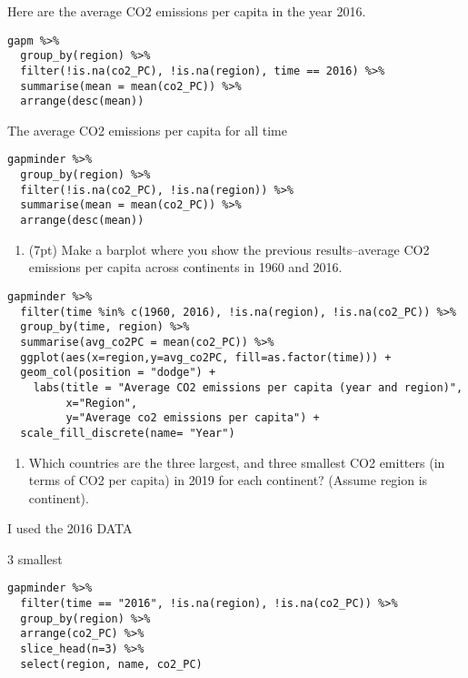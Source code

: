 \documentclass[]{article}
\providecommand{\tightlist}{%
  \setlength{\itemsep}{0pt}\setlength{\parskip}{0pt}}
\begin{document}
Here are the average CO2 emissions per capita in the year 2016.

\begin{verbatim}
gapm %>% 
  group_by(region) %>% 
  filter(!is.na(co2_PC), !is.na(region), time == 2016) %>% 
  summarise(mean = mean(co2_PC)) %>% 
  arrange(desc(mean))
\end{verbatim}

The average CO2 emissions per capita for all time

\begin{verbatim}
gapminder %>% 
  group_by(region) %>% 
  filter(!is.na(co2_PC), !is.na(region)) %>% 
  summarise(mean = mean(co2_PC)) %>% 
  arrange(desc(mean))
\end{verbatim}

\begin{enumerate}
\def\labelenumi{\arabic{enumi}.}
\setcounter{enumi}{4}
\tightlist
\item
  (7pt) Make a barplot where you show the previous results--average CO2
  emissions per capita across continents in 1960 and 2016.
\end{enumerate}

\begin{verbatim}
gapminder %>% 
  filter(time %in% c(1960, 2016), !is.na(region), !is.na(co2_PC)) %>% 
  group_by(time, region) %>% 
  summarise(avg_co2PC = mean(co2_PC)) %>% 
  ggplot(aes(x=region,y=avg_co2PC, fill=as.factor(time))) +
  geom_col(position = "dodge") +
    labs(title = "Average CO2 emissions per capita (year and region)",
         x="Region",
         y="Average co2 emissions per capita") +
  scale_fill_discrete(name= "Year")
\end{verbatim}

\begin{enumerate}
\def\labelenumi{\arabic{enumi}.}
\setcounter{enumi}{5}
\tightlist
\item
  Which countries are the three largest, and three smallest CO2 emitters
  (in terms of CO2 per capita) in 2019 for each continent? (Assume
  region is continent).
\end{enumerate}

I used the 2016 DATA

3 smallest

\begin{verbatim}
gapminder %>% 
  filter(time == "2016", !is.na(region), !is.na(co2_PC)) %>% 
  group_by(region) %>% 
  arrange(co2_PC) %>% 
  slice_head(n=3) %>% 
  select(region, name, co2_PC)
\end{verbatim}
\end{document}
